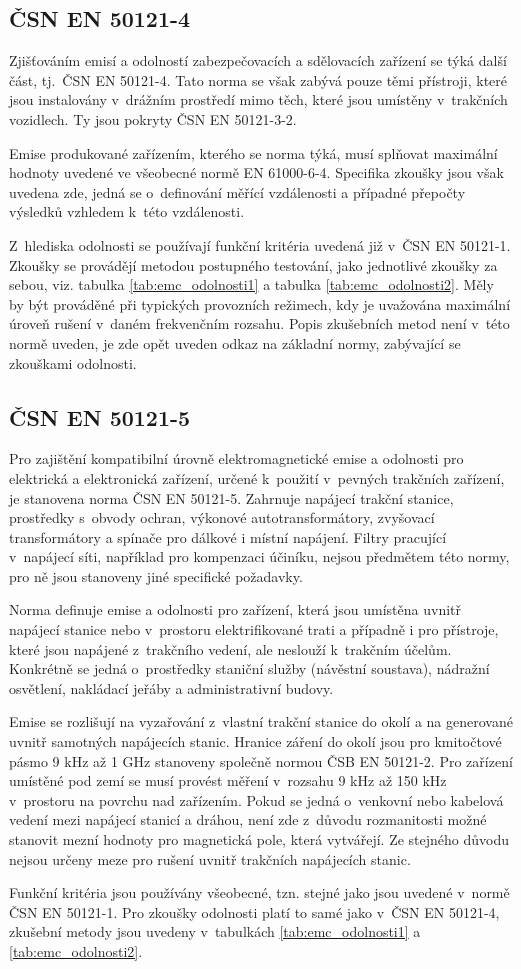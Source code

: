 \subsection{ČSN EN 50121-4}
Zjišťováním emisí a odolností zabezpečovacích a sdělovacích zařízení se týká další část, tj.~ČSN EN 50121-4. Tato norma se však zabývá pouze těmi přístroji, které jsou instalovány v~drážním prostředí mimo těch, které jsou umístěny v~trakčních vozidlech. Ty jsou pokryty ČSN EN 50121-3-2. 

Emise produkované zařízením, kterého se norma týká, musí splňovat maximální hodnoty uvedené ve všeobecné normě EN 61000-6-4. Specifika zkoušky jsou však uvedena zde, jedná se o~definování měřící vzdálenosti a případné přepočty výsledků vzhledem k~této vzdálenosti.

Z~hlediska odolnosti se používají funkční kritéria uvedená již v~ČSN EN 50121-1. Zkoušky se provádějí metodou postupného testování, jako jednotlivé zkoušky za sebou, viz. tabulka \ref{tab:emc_odolnosti1} a tabulka \ref{tab:emc_odolnosti2}.
 Měly by být prováděné při typických provozních režimech, kdy je uvažována maximální úroveň rušení v~daném frekvenčním rozsahu. Popis zkušebních metod není v~této normě uveden, je zde opět uveden odkaz na základní normy, zabývající se zkouškami odolnosti. 

\subsection{ČSN EN 50121-5}
Pro zajištění kompatibilní úrovně elektromagnetické emise a odolnosti pro elektrická a elektronická zařízení, určené k~použití v~pevných trakčních zařízení, je stanovena norma ČSN EN 50121-5. Zahrnuje  napájecí trakční stanice, prostředky s~obvody ochran, výkonové autotransformátory, zvyšovací transformátory a spínače pro dálkové i místní napájení. Filtry pracující v~napájecí síti, například pro kompenzaci účiníku, nejsou předmětem této normy,  pro ně jsou stanoveny jiné specifické požadavky. 

Norma definuje emise a odolnosti pro zařízení, která jsou umístěna uvnitř napájecí stanice nebo v~prostoru elektrifikované trati a případně i pro přístroje, které jsou napájené z~trakčního vedení, ale neslouží k~trakčním účelům. Konkrétně se jedná o~prostředky staniční služby (návěstní soustava), nádražní osvětlení, nakládací jeřáby a administrativní budovy.  

Emise se rozlišují na vyzařování z~vlastní trakční stanice do okolí a na generované uvnitř samotných napájecích stanic. Hranice záření do okolí jsou pro kmitočtové pásmo 9 kHz až 1 GHz stanoveny společně normou ČSB EN 50121-2. Pro zařízení umístěné pod zemí se musí provést měření v~rozsahu 9 kHz až 150 kHz v~prostoru na povrchu nad zařízením. Pokud se jedná o~venkovní nebo kabelová vedení mezi napájecí stanicí a dráhou, není zde z~důvodu rozmanitosti možné stanovit mezní hodnoty pro magnetická pole, která vytvářejí. Ze stejného důvodu nejsou určeny meze pro rušení uvnitř trakčních napájecích stanic. 

Funkční kritéria jsou používány všeobecné, tzn. stejné jako jsou uvedené v~normě ČSN EN 50121-1. Pro zkoušky odolnosti platí to samé jako v~ČSN EN 50121-4, zkušební metody jsou uvedeny v~tabulkách \ref{tab:emc_odolnosti1} a \ref{tab:emc_odolnosti2}.
